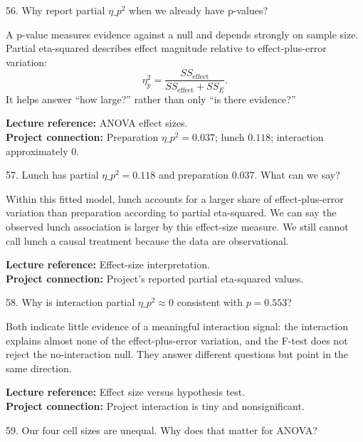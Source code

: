 \documentclass[10.5pt,a4paper]{article}
\newcommand{\chapref}[1]{\textbf{Lecture reference:} #1}
\newcommand{\projectref}[1]{\textbf{Project connection:} #1}
\begin{document}
\begin{qbox}{56. Why report partial $\eta\_p^2$ when we already have p-values?}
\end{qbox}
\begin{answerbox}A p-value measures evidence against a null and depends strongly on sample size. Partial eta-squared describes effect magnitude relative to effect-plus-error variation:
\[
\eta_p^2=\frac{SS_{\text{effect}}}{SS_{\text{effect}}+SS_E}.
\]
It helps answer ``how large?'' rather than only ``is there evidence?''\end{answerbox}
\begin{refbox}\chapref{ANOVA effect sizes.}\\\projectref{Preparation $\eta\_p^2=0.037$; lunch $0.118$; interaction approximately 0.}\end{refbox}
\begin{qbox}{57. Lunch has partial $\eta\_p^2=0.118$ and preparation 0.037. What can we say?}
\end{qbox}
\begin{answerbox}Within this fitted model, lunch accounts for a larger share of effect-plus-error variation than preparation according to partial eta-squared. We can say the observed lunch association is larger by this effect-size measure. We still cannot call lunch a causal treatment because the data are observational.\end{answerbox}
\begin{refbox}\chapref{Effect-size interpretation.}\\\projectref{Project's reported partial eta-squared values.}\end{refbox}
\begin{qbox}{58. Why is interaction partial $\eta\_p^2\approx0$ consistent with $p=0.553$?}
\end{qbox}
\begin{answerbox}Both indicate little evidence of a meaningful interaction signal: the interaction explains almost none of the effect-plus-error variation, and the F-test does not reject the no-interaction null. They answer different questions but point in the same direction.\end{answerbox}
\begin{refbox}\chapref{Effect size versus hypothesis test.}\\\projectref{Project interaction is tiny and nonsignificant.}\end{refbox}
\begin{qbox}{59. Our four cell sizes are unequal. Why does that matter for ANOVA?}
\end{qbox}
\end{document}
